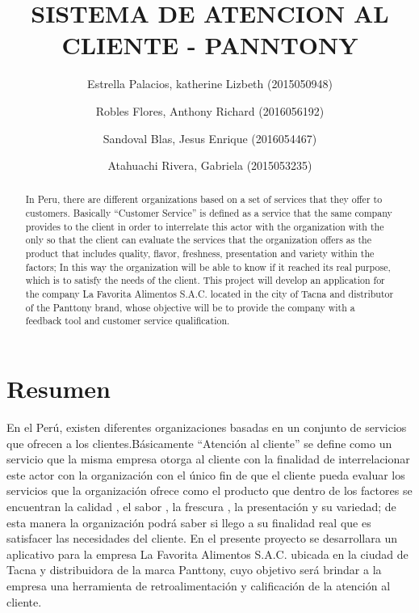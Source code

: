 \documentclass[preprint,12pt]{elsarticle}
\begin{document}
	
	\begin{frontmatter}

		\title{\huge  SISTEMA DE ATENCION AL CLIENTE - PANNTONY}
		
		\author{Estrella Palacios, katherine Lizbeth              (2015050948)}		
		\author{Robles Flores, Anthony Richard	              (2016056192)}
		\author{Sandoval Blas, Jesus Enrique           (2016054467)}
		\author{Atahuachi Rivera, Gabriela            (2015053235)}
		
		\address{Tacna, Perú}
		
		\begin{abstract}

In Peru, there are different organizations based on a set of services that they offer to customers. Basically “Customer Service” is defined as a service that the same company provides to the client in order to interrelate this actor with the organization with the only so that the client can evaluate the services that the organization offers as the product that includes quality, flavor, freshness, presentation and variety within the factors; In this way the organization will be able to know if it reached its real purpose, which is to satisfy the needs of the client. This project will develop an application for the company La Favorita Alimentos S.A.C. located in the city of Tacna and distributor of the Panttony brand, whose objective will be to provide the company with a feedback tool and customer service qualification.
		\end{abstract}
\end{frontmatter}

\section{Resumen}
En el Perú, existen diferentes organizaciones basadas en un conjunto de servicios que ofrecen a los clientes.Básicamente “Atención al cliente” se define como un servicio que la misma empresa otorga al cliente con la finalidad de interrelacionar este actor con la organización con el único fin de que el cliente pueda evaluar los servicios que la organización ofrece como el producto que dentro de los factores se encuentran la calidad , el sabor , la frescura , la presentación y su variedad; de esta  manera la organización podrá saber si llego a su finalidad real que es satisfacer las necesidades del cliente. En el presente proyecto se desarrollara un aplicativo para la empresa La Favorita Alimentos S.A.C. ubicada en la ciudad de Tacna y distribuidora de la marca Panttony, cuyo objetivo será brindar a la empresa una herramienta de retroalimentación y calificación de la atención al cliente.
\end{document}
